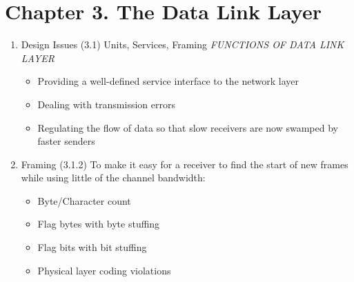 \documentclass[a4paper,10pt]{article}
\begin{document}
\newpage\section*{Chapter 3. The Data Link Layer}
\begin{enumerate}
  \item Design Issues (3.1)
    \newline Units, Services, Framing
    \newline
    \newline\textit{FUNCTIONS OF DATA LINK LAYER}
    \begin{itemize}
      \item Providing a well-defined service interface to the network layer
      \item Dealing with transmission errors
      \item Regulating the flow of data so that slow receivers are now swamped by faster senders
    \end{itemize}
  
  \item Framing (3.1.2)
    \newline To make it easy for a receiver to find the start of new frames while using little of the channel bandwidth:
    \begin{itemize}
      \item Byte/Character count
      \item Flag bytes with byte stuffing
      \item Flag bits with bit stuffing
      \item Physical layer coding violations
    \end{itemize}
  

\end{enumerate}
\end{document}
